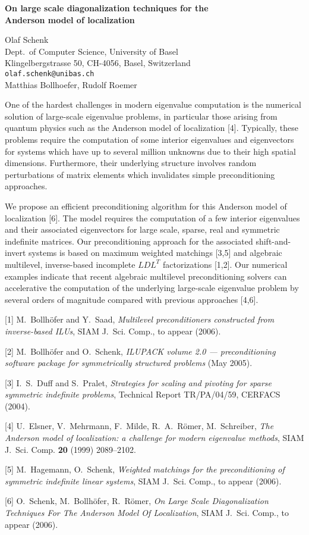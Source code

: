 \documentclass{report}
\begin{document}

\begin{center}
{\large
{\bf On large scale diagonalization techniques for the \\
	Anderson model of localization}}

	Olaf Schenk \\
	Dept.~of Computer Science, University of Basel \\
	Klingelbergstrasse 50, CH-4056, Basel, Switzerland \\
	{\tt olaf.schenk@unibas.ch} \\
	Matthias Bollhoefer, Rudolf Roemer
\end{center}
One of the hardest challenges in modern eigenvalue
computation is the numerical solution of large-scale
eigenvalue problems, in particular those arising from
quantum physics such as the Anderson model of localization
[4]. Typically, these problems require the computation of
some interior eigenvalues and eigenvectors for systems which
have up to several million unknowns due to their high
spatial dimensions. Furthermore, their underlying structure
involves random perturbations of matrix elements which
invalidates simple preconditioning approaches.

We propose
an efficient preconditioning algorithm for this Anderson
model of localization [6]. The model requires the
computation of a few interior eigenvalues and their
associated eigenvectors for large scale, sparse, real and
symmetric indefinite matrices. Our preconditioning approach
for the associated shift-and-invert systems is based on
maximum weighted matchings [3,5] and algebraic multilevel,
inverse-based incomplete $LDL^T$ factorizations [1,2]. Our
numerical examples indicate that recent algebraic multilevel
preconditioning solvers can accelerative the computation of
the underlying large-scale eigenvalue problem by several
orders of magnitude compared with previous approaches [4,6].

[1]
M.~Bollh\"ofer and Y.~Saad,
{\em Multilevel preconditioners
constructed from inverse-based {ILU}s},
SIAM J.~Sci. Comp.,
to appear (2006).

[2]
M.~Bollh\"ofer and O.~Schenk,
{\em {I}{L}{U}{P}{A}{C}{K} volume 2.0 ---
preconditioning software package for
symmetrically structured problems} (May 2005).

[3]
I.~S.~Duff and S.~Pralet,
{\em Strategies for scaling and pivoting for
sparse symmetric indefinite problems},
Technical Report TR/PA/04/59,
CERFACS (2004).

[4]
U.~Elsner, V.~Mehrmann,
F.~Milde, R.~A.~{R\"{o}mer}, M.~Schreiber,
{\em The {Anderson} model of localization: a challenge
for modern eigenvalue methods},
SIAM J.~Sci. Comp.
{\bf 20} (1999) 2089--2102.

[5]
M.~Hagemann, O.~Schenk,
{\em Weighted matchings for the preconditioning
of symmetric indefinite linear systems},
SIAM J.~Sci. Comp.,
to appear (2006).

[6]
O.~Schenk, M.~Bollh\"ofer, R.~R\"omer,
{\em On Large Scale Diagonalization Techniques
For The {Anderson} Model Of Localization},
SIAM J.~Sci. Comp., to appear (2006).



\end{document}
